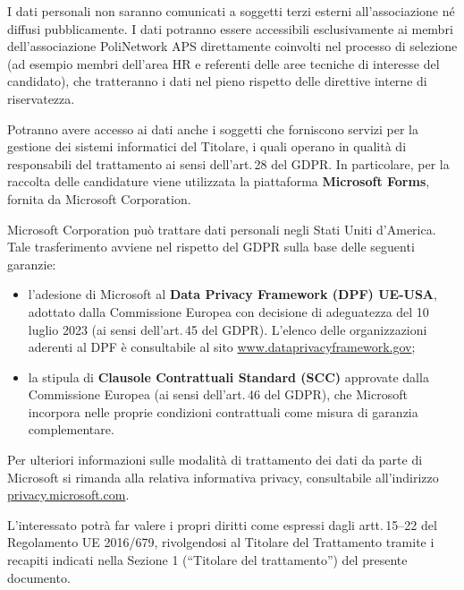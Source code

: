 \documentclass[legal]{polinetwork}
\begin{document}

I dati personali non saranno comunicati a soggetti terzi esterni
all'associazione né diffusi pubblicamente. I dati potranno essere
accessibili esclusivamente ai membri dell'associazione PoliNetwork APS
direttamente coinvolti nel processo di selezione (ad esempio membri
dell'area HR e referenti delle aree tecniche di interesse del candidato),
che tratteranno i dati nel pieno rispetto delle direttive interne di
riservatezza.

Potranno avere accesso ai dati anche i soggetti che forniscono servizi per
la gestione dei sistemi informatici del Titolare, i quali operano in
qualità di responsabili del trattamento ai sensi dell'art.\,28 del GDPR.
In particolare, per la raccolta delle candidature viene utilizzata la
piattaforma \textbf{Microsoft Forms}, fornita da Microsoft Corporation.


Microsoft Corporation può trattare dati personali negli Stati Uniti
d'America. Tale trasferimento avviene nel rispetto del GDPR sulla base
delle seguenti garanzie:

\begin{itemize}
  \item l'adesione di Microsoft al \textbf{Data Privacy Framework (DPF)
    UE-USA}, adottato dalla Commissione Europea con decisione di
    adeguatezza del 10 luglio 2023 (ai sensi dell'art.\,45 del GDPR).
    L'elenco delle organizzazioni aderenti al DPF è consultabile al sito
    \href{https://www.dataprivacyframework.gov}{www.dataprivacyframework.gov};
  \item la stipula di \textbf{Clausole Contrattuali Standard (SCC)}
    approvate dalla Commissione Europea (ai sensi dell'art.\,46 del GDPR),
    che Microsoft incorpora nelle proprie condizioni contrattuali come
    misura di garanzia complementare.
\end{itemize}

Per ulteriori informazioni sulle modalità di trattamento dei dati da parte
di Microsoft si rimanda alla relativa informativa privacy, consultabile
all'indirizzo
\href{https://privacy.microsoft.com}{privacy.microsoft.com}.


L'interessato potrà far valere i propri diritti come espressi dagli
artt.\,15--22 del Regolamento UE 2016/679, rivolgendosi al Titolare del
Trattamento tramite i recapiti indicati nella Sezione 1 (``Titolare del
trattamento'') del presente documento.
\end{document}
